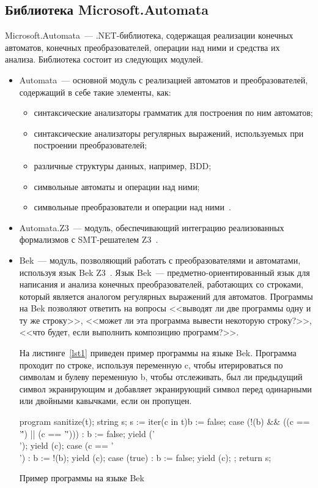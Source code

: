 \subsection{Библиотека Microsoft.Automata}
Microsoft.Automata~--- .NET-библиотека, содержащая реализации конечных автоматов, конечных преобразователей, операции над ними и средства их анализа. Библиотека состоит из следующих модулей.
\begin{itemize}
\item Automata~--- основной модуль с реализацией автоматов и преобразователей, содержащий в себе такие элементы, как:
    \begin{itemize}
    \item синтаксические анализаторы грамматик для построения по ним автоматов;
    \item синтаксические анализаторы регулярных выражений, используемых при построении преобразователей;
    \item различные структуры данных, например, BDD;
    \item символьные автоматы и операции над ними;
    \item символьные преобразователи и операции над ними~\cite{STcompose}. 
    \end{itemize}
\item Automata.Z3~--- модуль, обеспечивающий интеграцию реализованных формализмов с SMT-решателем Z3~\cite{Z3Url, articleZ3}.
\item Bek~--- модуль, позволяющий работать с преобразователями и автоматами, используя язык Bek Z3~\cite{BekUrl, BekArticle}. Язык Bek~--- предметно-ориентированный язык для написания и анализа конечных преобразователей, работающих со строками, который является аналогом регулярных выражений для автоматов. Программы на Bek позволяют ответить на вопросы <<выводят ли две программы одну и ту же строку>>, <<может ли эта программа вывести некоторую строку?>>, <<что будет, если выполнить композицию программ?>>.

На листинге~\ref{lst1} приведен пример программы на языке Bek. Программа проходит по строке, используя переменную c, чтобы итерироваться по символам и булеву переменную b, чтобы отслеживать, был ли предыдущий символ экранирующим и добавляет экранирующий символ перед одинарными или двойными кавычками, если он пропущен. 

\begin{listing}[H]
    \begin{pyglist}[language=csharp,numbers=left,numbersep=5pt]
program sanitize(t);
    string s; 
    s := iter(c in t){b := false;}{
            case (!(b) && ((c == '\'') || (c == '\"'))) :
                b := false;
                yield ('\\');
                yield (c);
            case (c == '\\') :
                b := !(b);
                yield (c);
            case (true) :
                b := false;
                yield (c);
            };
    return s;
    \end{pyglist}
\caption{Пример программы на языке Bek}
\label{lst1}
\end{listing}
\end{itemize}
